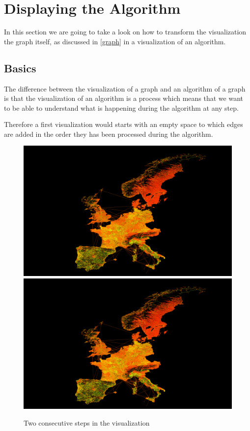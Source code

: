 \documentclass
[
	paper = a4,
    pagesize,
	12 pt,
	oneside,                       %
    open = right,
	DIV = calc,
	BCOR = 0 mm,                   %
	bibtotoc
]
{scrbook}
\begin{document}
\section{Displaying the Algorithm}

In this section we are going to take a look on how to transform the visualization the graph itself, as discussed in \cref{graph} in a visualization of an algorithm.



\subsection{Basics}

The difference between the visualization of a graph and an algorithm of a graph is that the visualization of an algorithm is a process which means that we want to be able to understand what is happening during the algorithm at any step.

Therefore a first visualization would starts with an empty space to which edges are added in the order they has been processed during the algorithm.

\begin{figure}[H]
	\includegraphics[width=.5\textwidth]{Images/placeholder.png}
	\includegraphics[width=.5\textwidth]{Images/placeholder.png}
\caption[]{Two consecutive steps in the visualization}
\label{fig:projections}
\end{figure}
\end{document}

